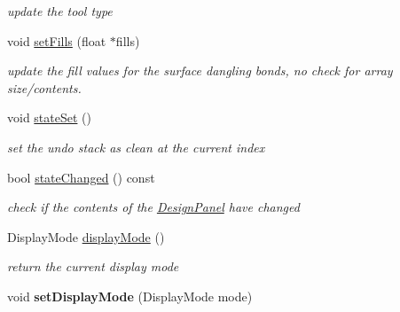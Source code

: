 \begin{DoxyCompactItemize}
\begin{DoxyCompactList}\small\item\em update the tool type \end{DoxyCompactList}\item 
void \hyperlink{classgui_1_1DesignPanel_a0564f2bcce6a720c839151af8f7f76ff}{set\+Fills} (float $\ast$fills)\hypertarget{classgui_1_1DesignPanel_a0564f2bcce6a720c839151af8f7f76ff}{}\label{classgui_1_1DesignPanel_a0564f2bcce6a720c839151af8f7f76ff}

\begin{DoxyCompactList}\small\item\em update the fill values for the surface dangling bonds, no check for array size/contents. \end{DoxyCompactList}\item 
void \hyperlink{classgui_1_1DesignPanel_aebf1c7bef47378ef2123e43fd2c85172}{state\+Set} ()\hypertarget{classgui_1_1DesignPanel_aebf1c7bef47378ef2123e43fd2c85172}{}\label{classgui_1_1DesignPanel_aebf1c7bef47378ef2123e43fd2c85172}

\begin{DoxyCompactList}\small\item\em set the undo stack as clean at the current index \end{DoxyCompactList}\item 
bool \hyperlink{classgui_1_1DesignPanel_a62213e43378c367b01339cf01cf457ae}{state\+Changed} () const \hypertarget{classgui_1_1DesignPanel_a62213e43378c367b01339cf01cf457ae}{}\label{classgui_1_1DesignPanel_a62213e43378c367b01339cf01cf457ae}

\begin{DoxyCompactList}\small\item\em check if the contents of the \hyperlink{classgui_1_1DesignPanel}{Design\+Panel} have changed \end{DoxyCompactList}\item 
Display\+Mode \hyperlink{classgui_1_1DesignPanel_a8e08af018491439a7f92cdc1743be0f8}{display\+Mode} ()\hypertarget{classgui_1_1DesignPanel_a8e08af018491439a7f92cdc1743be0f8}{}\label{classgui_1_1DesignPanel_a8e08af018491439a7f92cdc1743be0f8}

\begin{DoxyCompactList}\small\item\em return the current display mode \end{DoxyCompactList}\item 
void {\bfseries set\+Display\+Mode} (Display\+Mode mode)\hypertarget{classgui_1_1DesignPanel_a9e05f3465a03089ccf55106f25751df4}{}\label{classgui_1_1DesignPanel_a9e05f3465a03089ccf55106f25751df4}


\end{DoxyCompactItemize}
